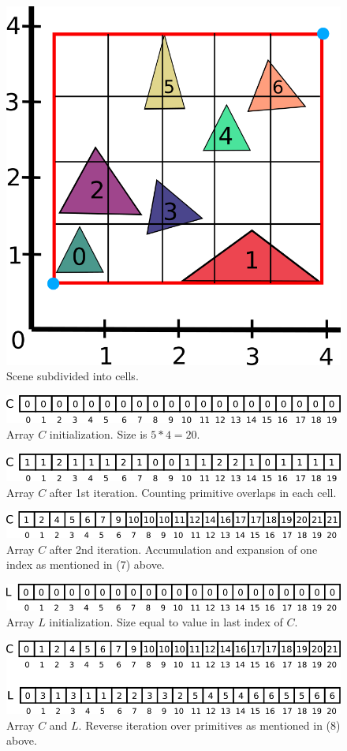 \documentclass[11pt,a4paper]{article}
\begin{document}
\begin{figure}[H]
	\centering
	\captionsetup{justification=centering}
	\includegraphics[width=.3\textwidth]{compact_grid_3}\quad
	\caption{Scene subdivided into cells.}
\end{figure}
\noindent
\begin{figure}[H]
	\centering
	\captionsetup{justification=centering}
	\includegraphics[width=.65\textwidth]{compact_grid_4}\quad
	\caption{Array $C$ initialization. Size is $5 * 4 = 20$.}
\end{figure}
\noindent
\begin{figure}[H]
	\centering
	\captionsetup{justification=centering}
	\includegraphics[width=.65\textwidth]{compact_grid_5}\quad
	\caption{Array $C$ after 1st iteration. Counting primitive overlaps in each cell.}
\end{figure}
\begin{figure}[H]
	\centering
	\captionsetup{justification=centering}
	\includegraphics[width=.65\textwidth]{compact_grid_6}\quad
	\caption{Array $C$ after 2nd iteration. Accumulation and expansion of one index as mentioned in (7) above.}
\end{figure}
\begin{figure}[H]
	\centering
	\captionsetup{justification=centering}
	\includegraphics[width=.65\textwidth]{compact_grid_7}\quad
	\caption{Array $L$ initialization. Size equal to value in last index of $C$.}
\end{figure}
\begin{figure}[H]
	\centering
	\captionsetup{justification=centering}
	\includegraphics[width=.7\textwidth]{compact_grid_8}\quad
	\caption{Array $C$ and $L$. Reverse iteration over primitives as mentioned in (8) above.}
\end{figure}
\end{document}

